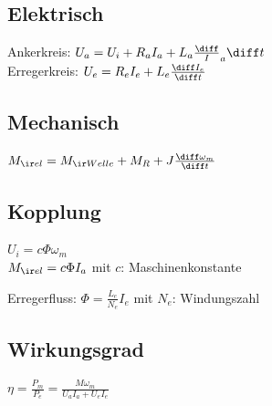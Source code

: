 \documentclass[fs, german]{latex4ei_fs}
\begin{document}
\begin{sectionbox}

\subsection*{Elektrisch}

Ankerkreis: $U_a = U_i + R_a I_a + L_a \frac \diff I_a \diff t$ \\
Erregerkreis: $U_e = R_e I_e + L_e \frac{\diff I_e}{\diff t}$

\subsection*{Mechanisch}
$M_{\ir el} = M_{\ir Welle} + M_R + J \frac{\diff \omega_m}{\diff t}$

\subsection*{Kopplung}
$U_i = c \Phi \omega_m$ \\
$M_{\ir el} = c \Phi I_a$ \quad mit $c$: Maschinenkonstante

Erregerfluss: $\Phi = \frac{L_e}{N_e} I_e$ \quad mit $N_e$: Windungszahl


\subsection*{Wirkungsgrad}
$\eta = \frac{P_m}{P_e} = \frac{M \omega_m}{U_a I_a + U_e I_e}$
\end{sectionbox}
\end{document}
